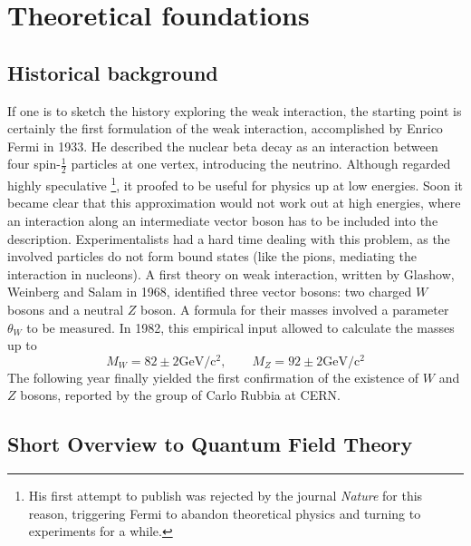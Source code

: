 \section{Theoretical foundations}
\subsection{Historical background}
If one is to sketch the history exploring the weak interaction, 
the starting point is certainly the first formulation of the 
weak interaction, accomplished by Enrico Fermi in 1933. 
He described the nuclear beta decay as an interaction 
between four spin-$\frac{1}{2}$ particles at one vertex, 
introducing the neutrino. Although regarded highly speculative%
\footnote{His first attempt to publish was rejected by the journal
\emph{Nature} for this reason, triggering Fermi to abandon 
theoretical physics and turning to experiments for a while.}, 
it proofed to be useful for physics up at low energies. 
Soon it became clear that this approximation would not work out 
at high energies, where an interaction along an intermediate 
vector boson has to be included into the description. 
Experimentalists had a hard time dealing with this problem, 
as the involved particles do not form bound states (like the 
pions, mediating the interaction in nucleons). A first theory
on weak interaction, written by Glashow, Weinberg and Salam 
in 1968, identified three vector bosons: two charged $W$ bosons 
and a neutral $Z$ boson. A formula for their masses involved a 
parameter $\theta_W$ to be measured. In 1982, this empirical 
input allowed to calculate the masses up to
\begin{equation}
    M_W = 82 \pm 2 \mathrm{GeV / c^2},\qquad 
    M_Z = 92 \pm 2 \mathrm{GeV / c^2}
\end{equation}
The following year finally yielded the first confirmation 
of the existence of $W$ and $Z$ bosons, reported by the group 
of Carlo Rubbia at CERN\@.

\subsection{Short Overview to Quantum Field Theory}
\label{sub:qft}

